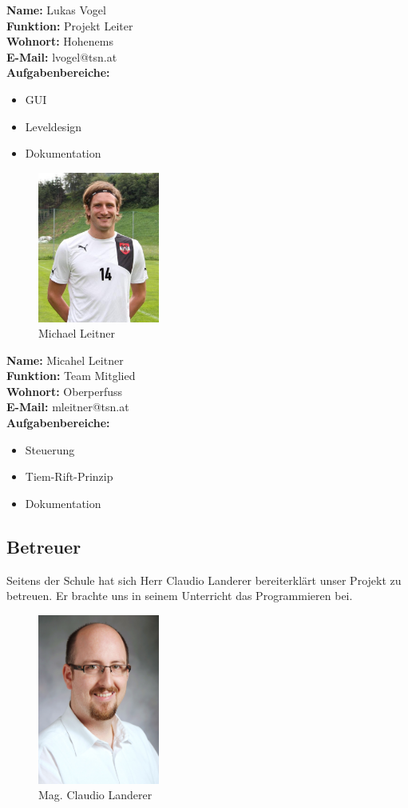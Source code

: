 	\textbf{Name:} Lukas Vogel\\
\textbf{Funktion:} Projekt Leiter\\
\textbf{Wohnort:} Hohenems\\
\textbf{E-Mail:} lvogel@tsn.at\\
\textbf{Aufgabenbereiche:} \begin{itemize}
	\item GUI
	\item Leveldesign
	\item Dokumentation
\end{itemize}
\begin{figure}[H]
	\centering
	\includegraphics[width=4cm]{images/leitnerBeisp.jpg}
	\caption{Michael Leitner}
\end{figure}
	\textbf{Name:} Micahel Leitner\\
\textbf{Funktion:} Team Mitglied\\
\textbf{Wohnort:} Oberperfuss\\
\textbf{E-Mail:} mleitner@tsn.at\\
\textbf{Aufgabenbereiche:} \begin{itemize}
	\item Steuerung
	\item Tiem-Rift-Prinzip
	\item Dokumentation
\end{itemize}
\newpage
\subsection{Betreuer}
Seitens der Schule hat sich Herr Claudio Landerer bereiterklärt unser Projekt zu betreuen. Er brachte uns in seinem Unterricht das Programmieren bei. 
	\begin{figure}[H]
		\centering
		\includegraphics[width=4cm]{images/Landerer_Claudio.jpg}
		\caption{Mag. Claudio Landerer}
	\end{figure}
		

